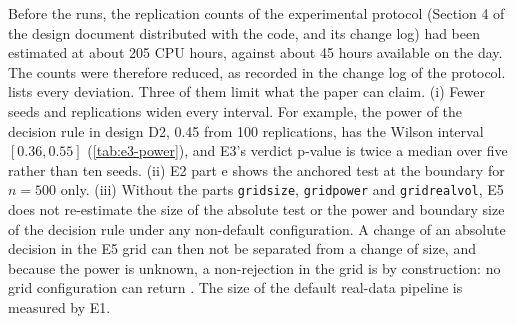 Before the runs, the replication counts of the experimental protocol (Section 4 of the design
document distributed with the code, and its change log) had been estimated at about 205 CPU
hours, against about 45 hours available on the day. The counts were therefore reduced, as
recorded in the change log of the protocol.  lists every deviation. Three of
them limit what the paper can claim. (i) Fewer seeds and replications widen every interval. For
example, the power of the decision rule in design D2, 0.45 from 100 replications, has the
Wilson interval $[0.36,0.55]$ (\cref{tab:e3-power}), and E3's verdict p-value is twice a median
over five rather than ten seeds. (ii) E2 part e shows the anchored
test at the boundary for $n=500$ only. (iii) Without the parts \texttt{gridsize},
\texttt{gridpower} and \texttt{gridrealvol}, E5 does not re-estimate the size of the absolute
test or the power and boundary size of the decision rule under any non-default configuration.
A change of an absolute decision in the E5 grid can then not be separated from a change of size,
and because the power is unknown, a non-rejection in the grid is \INCONCL{} by construction: no
grid configuration can return \GOOD{}. The size of the default real-data pipeline is measured by
E1.

